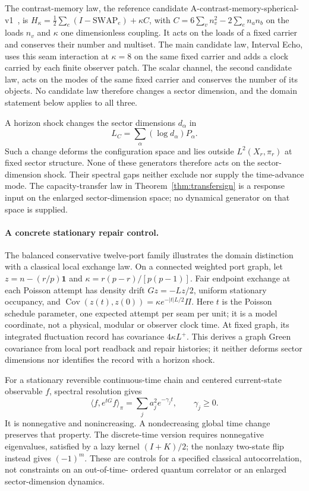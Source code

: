 \documentclass[11pt]{article}
\theoremstyle{remark}
\begin{document}
The contrast-memory law, the reference candidate
A-contrast-memory-spherical-v1~\cite{ophmodel}, is
\(H_\kappa=\tfrac12\sum_e(I-\mathrm{SWAP}_e)+\kappa C\), with
\(C=6\sum_vn_v^2-2\sum_en_an_b\) on the loads \(n_v\) and \(\kappa\) one
dimensionless coupling. It
acts on the loads of a fixed carrier and conserves their number and
multiset. The main candidate law, Interval Echo, uses this seam interaction
at \(\kappa=8\) on the same fixed carrier and adds a clock carried by each
finite observer patch. The scalar channel, the second candidate law, acts on the modes of
the same fixed carrier and conserves the number of its objects. No candidate
law therefore changes a sector dimension, and the domain statement below
applies to all three.

A horizon shock changes the sector dimensions \(d_\alpha\) in
\[
L_C=\sum_\alpha(\log d_\alpha)P_\alpha .
\]
Such a change deforms the configuration space and lies outside
\(L^2(X_r,\pi_r)\) at fixed sector structure. None of these generators
therefore acts on the sector-dimension shock. Their spectral gaps neither exclude
nor supply the time-advance mode. The capacity-transfer law in
Theorem~\ref{thm:transfersign} is a response input on the enlarged
sector-dimension space; no dynamical generator on that space is supplied.

\paragraph{A concrete stationary repair control.}
The balanced conservative twelve-port family illustrates the domain
distinction with a classical local exchange law. On a connected weighted
port graph, let \(z=n-(r/p)\mathbf1\) and
\(\kappa=r(p-r)/[p(p-1)]\). Fair endpoint exchange at each Poisson
attempt has density drift \(Gz=-Lz/2\), uniform stationary occupancy,
and \(\operatorname{Cov}(z(t),z(0))=\kappa e^{-|t|L/2}\Pi\).
Here \(t\) is the Poisson schedule parameter, one expected attempt per seam
per unit; it is a model coordinate, not a physical, modular or observer clock
time. At fixed graph, its integrated fluctuation record has covariance
\(4\kappa L^+\). This derives a graph Green covariance from local port
readback and repair histories; it neither deforms sector dimensions nor
identifies the record with a horizon shock.

For a stationary reversible continuous-time chain and centered
current-state observable \(f\), spectral resolution gives
\[
 \langle f,e^{tG}f\rangle_\pi=\sum_j a_j^2e^{-\gamma_jt},
 \qquad \gamma_j\ge0.
\]
It is nonnegative and nonincreasing. A nondecreasing global time change
preserves that property. The discrete-time version requires nonnegative
eigenvalues, satisfied by a lazy kernel \((I+K)/2\); the nonlazy
two-state flip instead gives \((-1)^m\). These are controls for a
specified classical autocorrelation, not constraints on an out-of-time-
ordered quantum correlator or an enlarged sector-dimension dynamics.
\end{document}
